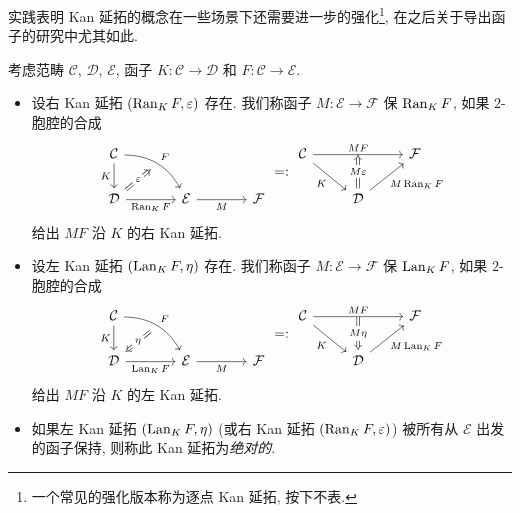 实践表明 Kan 延拓的概念在一些场景下还需要进一步的强化\footnote{一个常见的强化版本称为逐点 Kan 延拓, 按下不表.}, 在之后关于导出函子的研究中尤其如此.

\begin{definition}\label{def:absolute-Kan}
	考虑范畴 $\mathcal{C}$, $\mathcal{D}$, $\mathcal{E}$, 函子 $K: \mathcal{C} \to \mathcal{D}$ 和 $F: \mathcal{C} \to \mathcal{E}$.
	\begin{itemize}
		\item 设右 Kan 延拓 $(\operatorname{Ran}_K F, \varepsilon)$ 存在. 我们称函子 $M: \mathcal{E} \to \mathcal{F}$ 保 $\operatorname{Ran}_K F$, 如果 $2$-胞腔的合成
		\[\begin{tikzcd}[column sep=large]
			\mathcal{C} \arrow[d, "K"'] \arrow[rd, bend left, "F", ""' {name=F}] & & \\
			\mathcal{D} \arrow[r, "{\Ran_K F}"'] \arrow[Rightarrow, to=F, "\varepsilon" description] & \mathcal{E} \arrow[r, "M"'] & \mathcal{F}
		\end{tikzcd} =: \begin{tikzcd}
			\mathcal{C} \arrow[rr, "MF", ""{name=MF}] \arrow[rd, "K"'] & & \mathcal{F}  \\
			& \mathcal{D} \arrow[ru, "{M \Ran_K F}"'] \arrow[Rightarrow, to=MF, "M\varepsilon" description] &
		\end{tikzcd}\]
		给出 $MF$ 沿 $K$ 的右 Kan 延拓.
		\item 设左 Kan 延拓 $(\operatorname{Lan}_K F, \eta)$ 存在. 我们称函子 $M: \mathcal{E} \to \mathcal{F}$ 保 $\operatorname{Lan}_K F$, 如果 $2$-胞腔的合成
		\[\begin{tikzcd}[column sep=large]
			\mathcal{C} \arrow[d, "K"'] \arrow[rd, bend left, "F", ""' {name=F}] & & \\
			\mathcal{D} \arrow[r, "{\Lan_K F}"'] \arrow[Rightarrow, from=F, "\eta" description] & \mathcal{E} \arrow[r, "M"'] & \mathcal{F}
		\end{tikzcd} =: \begin{tikzcd}
			\mathcal{C} \arrow[rr, "MF", ""{name=MF}] \arrow[rd, "K"'] & & \mathcal{F}  \\
			& \mathcal{D} \arrow[ru, "{M \Lan_K F}"'] \arrow[Rightarrow, from=MF, "M\eta" description] &
		\end{tikzcd}\]
		给出 $MF$ 沿 $K$ 的左 Kan 延拓.
		\item 如果左 Kan 延拓 $(\operatorname{Lan}_K F, \eta)$ (或右 Kan 延拓 $(\operatorname{Ran}_K F, \varepsilon)$) 被所有从 $\mathcal{E}$ 出发的函子保持, 则称此 Kan 延拓为\emph{绝对的}.
	\end{itemize}
\end{definition}

